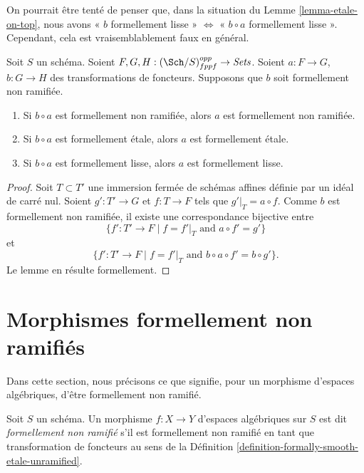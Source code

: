\begin{remark}
\label{remark-tempting}
On pourrait être tenté de penser que, dans la situation du
Lemme \ref{lemma-etale-on-top},
nous avons
« $b$ formellement lisse » $\Leftrightarrow$ « $b \circ a$ formellement lisse ».
Cependant, cela est vraisemblablement faux en général.
\end{remark}

\begin{lemma}
\label{lemma-formally-permanence}
Soit $S$ un schéma.
Soient $F, G, H : (\Sch/S)_{fppf}^{opp} \to \textit{Sets}$.
Soient $a : F \to G$, $b : G \to H$ des transformations de foncteurs.
Supposons que $b$ soit formellement non ramifiée.
\begin{enumerate}
\item Si $b \circ a$ est formellement non ramifiée, alors $a$ est formellement non ramifiée.
\item Si $b \circ a$ est formellement étale, alors $a$ est formellement étale.
\item Si $b \circ a$ est formellement lisse, alors $a$ est formellement lisse.
\end{enumerate}
\end{lemma}

\begin{proof}
Soit $T \subset T'$ une immersion fermée de schémas affines définie par un idéal
de carré nul. Soient $g' : T' \to G$ et $f : T \to F$ tels que
$g'|_T = a \circ f$. Comme $b$ est formellement non ramifiée, il existe une correspondance
bijective entre
$$
\{f' : T' \to F \mid f = f'|_T\text{ and }a \circ f' = g'\}
$$
et
$$
\{f' : T' \to F \mid f = f'|_T\text{ and }b \circ a \circ f' = b \circ g'\}.
$$
Le lemme en résulte formellement.
\end{proof}








\section{Morphismes formellement non ramifiés}
\label{section-formally-unramified}

\noindent
Dans cette section, nous précisons ce que signifie, pour un morphisme d'espaces algébriques,
d'être formellement non ramifié.

\begin{definition}
\label{definition-formally-unramified}
Soit $S$ un schéma. Un morphisme $f : X \to Y$ d'espaces algébriques sur $S$
est dit {\it formellement non ramifié} s'il est formellement non ramifié en tant que
transformation de foncteurs au sens de la
Définition \ref{definition-formally-smooth-etale-unramified}.
\end{definition}


